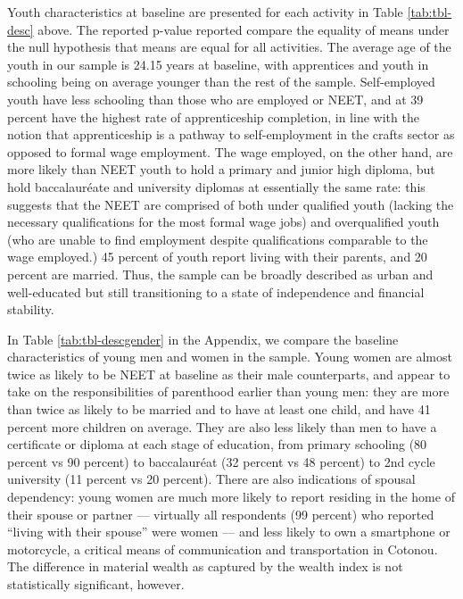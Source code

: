 \documentclass[
  11pt,
a4paper
]{article}
\begin{document}
Youth characteristics at baseline are presented for each activity in Table \ref{tab:tbl-desc} above. The reported p-value reported compare the equality of means under the null hypothesis that means are equal for all activities. The average age of the youth in our sample is 24.15 years at baseline, with apprentices and youth in schooling being on average younger than the rest of the sample. Self-employed youth have less schooling than those who are employed or NEET, and at 39 percent have the highest rate of apprenticeship completion, in line with the notion that apprenticeship is a pathway to self-employment in the crafts sector as opposed to formal wage employment. The wage employed, on the other hand, are more likely than NEET youth to hold a primary and junior high diploma, but hold baccalauréate and university diplomas at essentially the same rate: this suggests that the NEET are comprised of both under qualified youth (lacking the necessary qualifications for the most formal wage jobs) and overqualified youth (who are unable to find employment despite qualifications comparable to the wage employed.) 45 percent of youth report living with their parents, and 20 percent are married. Thus, the sample can be broadly described as urban and well-educated but still transitioning to a state of independence and financial stability.

In Table \ref{tab:tbl-descgender} in the Appendix, we compare the baseline characteristics of young men and women in the sample. Young women are almost twice as likely to be NEET at baseline as their male counterparts, and appear to take on the responsibilities of parenthood earlier than young men: they are more than twice as likely to be married and to have at least one child, and have 41 percent more children on average. They are also less likely than men to have a certificate or diploma at each stage of education, from primary schooling (80 percent vs 90 percent) to baccalauréat (32 percent vs 48 percent) to 2nd cycle university (11 percent vs 20 percent). There are also indications of spousal dependency: young women are much more likely to report residing in the home of their spouse or partner --- virtually all respondents (99 percent) who reported ``living with their spouse'' were women --- and less likely to own a smartphone or motorcycle, a critical means of communication and transportation in Cotonou. The difference in material wealth as captured by the wealth index is not statistically significant, however.
\end{document}
